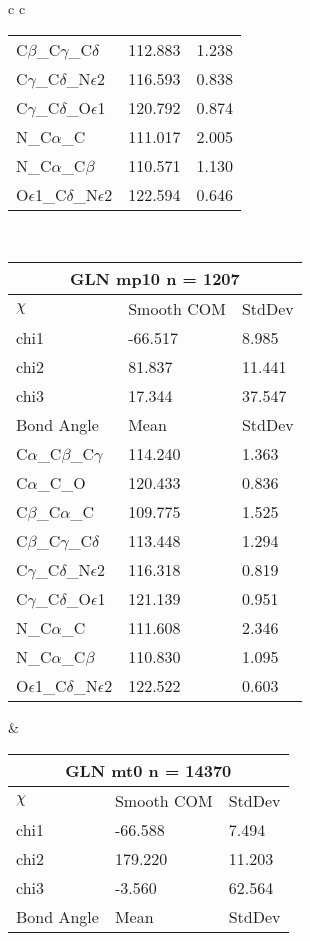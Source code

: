 \begin{longtable}{ c c }
\begin{tabular}{ l l l }
  C$\beta$\_C$\gamma$\_C$\delta$ & 112.883 & 1.238\\
  C$\gamma$\_C$\delta$\_N$\epsilon$2 & 116.593 & 0.838\\
  C$\gamma$\_C$\delta$\_O$\epsilon$1 & 120.792 & 0.874\\
  N\_C$\alpha$\_C & 111.017 & 2.005\\
  N\_C$\alpha$\_C$\beta$ & 110.571 & 1.130\\
  O$\epsilon$1\_C$\delta$\_N$\epsilon$2 & 122.594 & 0.646\\
  \bottomrule
  \end{tabular}
  \\
  \begin{tabular}{ l l l }
  \toprule
  \multicolumn{3}{c}{GLN \textbf{mp10} n = 1207} \\ \toprule
  $\chi$       & Smooth COM & StdDev \\ \midrule
  chi1 & -66.517 & 8.985 \\ 
  chi2 & 81.837 & 11.441 \\ 
  chi3 & 17.344 & 37.547 \\ \midrule
  Bond Angle   & Mean     & StdDev \\ \midrule
  C$\alpha$\_C$\beta$\_C$\gamma$ & 114.240 & 1.363\\
  C$\alpha$\_C\_O & 120.433 & 0.836\\
  C$\beta$\_C$\alpha$\_C & 109.775 & 1.525\\
  C$\beta$\_C$\gamma$\_C$\delta$ & 113.448 & 1.294\\
  C$\gamma$\_C$\delta$\_N$\epsilon$2 & 116.318 & 0.819\\
  C$\gamma$\_C$\delta$\_O$\epsilon$1 & 121.139 & 0.951\\
  N\_C$\alpha$\_C & 111.608 & 2.346\\
  N\_C$\alpha$\_C$\beta$ & 110.830 & 1.095\\
  O$\epsilon$1\_C$\delta$\_N$\epsilon$2 & 122.522 & 0.603\\
  \bottomrule
  \end{tabular}
  &
  \begin{tabular}{ l l l }
  \toprule
  \multicolumn{3}{c}{GLN \textbf{mt0} n = 14370} \\ \toprule
  $\chi$       & Smooth COM & StdDev \\ \midrule
  chi1 & -66.588 & 7.494 \\ 
  chi2 & 179.220 & 11.203 \\ 
  chi3 & -3.560 & 62.564 \\ \midrule
  Bond Angle   & Mean     & StdDev \\ \midrule

\end{tabular}
\end{longtable}
